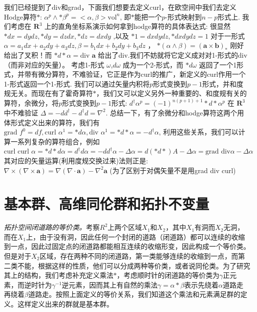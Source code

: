 \documentclass[supercite]{HustGraduPaper}
\begin{document}
\begin{appendices}
		我们已经提到了div和grad，下面我们想要去定义curl，在欧空间中我们去定义Hodge算符$*$:
		$\alpha^p \wedge *\beta^p = <\alpha,\beta> \text{vol}^n $,
		即$*$能把一个$p$-形式映射到$n-p$形式上. 我们考虑在 $\mathbf{R}^3$ 上的直角坐标系演示如何拿到hodge算符的具体表达式:
		很显然$ *dx = dydz, *dy=dzdx,*dz=dxdy$ ,以及 $*1 = dxdydz, *dxdydz=1$ 
		对于一形式 $\alpha = a_1dx+a_2dy+a_3dz,\beta = b_1 dx+b_2dy+b_3dz$ ，
		$*(\alpha \wedge \beta) = (\mathbf{a} \times \mathbf{b})_*$ 刚好给出了叉积！而 $*d*\alpha = \text{div } \mathbf{a}$ 给出了div.我们不妨就将它定义成对对1-形式的div（而非对应的矢量）。
		考虑1-形式 $\omega $,$d\omega$ 成为一个2-形式，而 $*d\omega$ 返回了一个1形式，并带有微分算符，不难验证，它正是作为curl的推广，新定义的curl作用一个1-形式返回一个1-形式.
		我们可以通过矢量内积将$p$形式变换到$p-1$形式，并和度规无关。而现在有了霍奇算符$*$，我们又可以定义另外一种重要的、和度规有关的算符，余微分，将$p$形式变换到$p-1$形式:
		$d^\dagger \alpha^p = (-1)^{n(p+1) +1} *d*\alpha^p$ 
		在 $\mathbf{R}^3$ 中不难验证 $\Delta = -dd^\dagger - d^\dagger d = \nabla^2 $.
		总结一下，有了余微分和hodge算符这两个用体形式定义出来的算符，我们有 $\text{grad }f^0 = df, \text{curl } \alpha^1 = *d\alpha, \text{div } \alpha^1 = *d*\alpha =-d^\dagger \alpha$, 
		利用这些关系，我们可以计算一系列复杂的算符组合，例如
		$\text{curl }\text{curl } \alpha=*d*d\alpha = d^\dagger d\alpha= -dd^\dagger \alpha -\Delta \alpha = d(*d*)A -\Delta \alpha = \text{grad} \text{ div} \alpha - \Delta \alpha   $
		其对应的矢量运算(利用度规交换过来)法则正是:$
		\nabla \times (\nabla \times \mathbf{a}) = \nabla(\nabla \cdot \mathbf{a}) - \nabla^2 \mathbf{a}$ (为了区别于对偶矢量不是用grad div curl)
		
		
		\section{基本群、高维同伦群和拓扑不变量\label{appendix: homology}}
		
		\textit{拓扑空间闭道路的等价类。}考察$R^2$上两个区域$X_1$和$X_2$，其中$X_1$有洞而$X_2$无洞，而在$X_1$上，由于没有洞，因此任何一个封闭的道路（闭道路）都可以连续的收缩到一点，因此过固定点的闭道路都能相互连续的收缩形变，因此构成一个等价类。但是对于$X_2$区域，存在两种不同的闭道路，第一类能够连续的收缩到一点，而第二类不能，根据这样的性质，他们可以分成两种等价类，或者说同伦类。为了研究其上的结构，我们考虑补充定义乘法$*$，考虑顺时针的闭道路的等价类为$\gamma$正元素，而逆时针为$\gamma^{-1}$逆元素，因而其上有自然的乘法$\gamma = \alpha * \beta$表示先绕着$\alpha$道路走再绕着$\beta$道路走。按照上面定义的等价关系，我们知道这个乘法和元素满足群的定义。这样定义出来的群就是基本群。
		

\end{appendices}
\end{document}
